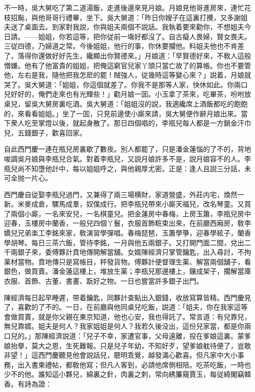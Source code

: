 不一時，吳大舅吃了第二道湯飯，走進後邊來見月娘。月娘見他哥進房來，連忙花枝招颭，與他哥哥行禮畢，坐下。吳大舅道：「昨日你嫂子在這裏打攪，又多謝姐夫送了桌面去。到家對我説，你與姐夫兩個不説話。我執着要來勸你，不想姐夫今日請。——姐姐，你若這等，把你従前一塲好都沒了。自古癡人畏婦，賢女畏夫。三従四德，乃婦道之常。今後姐姐，他行的事，你休要攔他。料姐夫他也不肯差了，落得你還做好好先生，纔顯出你賢德來。」月娘道：「早賢德好來，不敎人這般憎嫌。他有了他富貴的姐姐，把俺這窮官兒家丫頭只當亡故了的算帳。你也不要管他，左右是我，隨他把我怎麽的罷！賊強人，従幾時這等變心來？」説着，月娘就哭了。吳大舅道：「姐姐，你這個就差了。你我不是那等人家，快休如此。你兩口兒好好的，俺們走來也有光輝些！」勸月娘一囬。小玉拿了茶來，吃畢茶，吩咐放桌兒，留吳大舅房裏吃酒。吳大舅道：「姐姐沒的説，我適纔席上酒飯都吃的飽飽的，來看看姐姐。」坐了一囬，只見前邊使小廝來請，吳大舅便作辭月娘出來。當下衆人吃至掌燈以後，就起身散了。那日四個唱的，李瓶兒每人都是一方銷金汗巾兒，五錢銀子，歡喜回家。

自此西門慶一連在瓶兒房裏歇了數夜。別人都罷了，只是潘金蓮惱的了不的，背地唆調吳月娘與李瓶兒合氣。對着李瓶兒，又説月娘許多不是，説月娘容不的人。李瓶兒尚不知墮他計中，每以姐姐呼之，與他親厚尤密。正是：逢人且説三分話，未可全抛一片心。

西門慶自従娶李瓶兒過門，又兼得了兩三場横財，家道營盛，外莊内宅，煥然一新。米麥成倉，騾馬成羣，奴僕成行。把李瓶兒帶來小廝天福兒，改名琴童。又買了兩個小廝，一名來安兒，一名棋童兒。把金蓮房中春梅，上房玉簫，李瓶兒房中迎春，玉樓房中蘭香，一般兒四個丫鬟，衣服首飾粧束出來，在前廳西廂房，敎李嬌兒兄弟楽工李銘來家，敎演習學彈唱。春梅琵琶，玉簫學箏，迎春學絃子，蘭香學胡琴。每日三茶六飯，管待李銘，一月與他五兩銀子。又打開門面二間，兌出二千兩銀子來，委傅夥計賁地傳開解當舖。女婿陳經濟只掌管鑰匙，出入尋討，不拘薬材當物。賁地傳只是寫帳目，秤發貨物。傅夥計便督理生薬、解當兩個舖子，看銀色，做買賣。潘金蓮這樓上，堆放生薬；李瓶兒那邊樓上，鑲成架子，擱解當庫衣服、首飾、古董、書畫、翫好之物。一日也嘗當許多銀子出門。

陳經濟每日起早睡遲，带着鑰匙，同夥計查點出入銀錢，收放寫算皆精。西門慶見了，喜歡的了不的。一日，在前廳與他同桌兒吃飯，説道：「姐夫，你在我家這等會做買賣，就是你父親在東京知道，他也心安，我也得託了。常言道：有兒靠兒，無兒靠婿。姐夫是何人？我家姐姐是何人？我若久後没出，這份兒家當，都是你兩口兒的。」那陳經濟説道：「兒子不幸，家遭官事，父母遠離，投在爹娘這裏。蒙爹娘抬擧，莫大之恩，生死難報。只是兒子年幼，不知好歹，望爹娘躭待便了，豈敢非望！」這西門慶聽見他會説話兒，聰明乖覺，越發滿心歡喜。但凡家中大小事務，出入書柬禮帖，都敎他寫；但凡人客到，必請他席側相陪。吃茶吃飯，一時也少不的他。誰知這小夥兒，綿裏之針，肉裏之刺，常向綉簾窺賈玉，每従綺閣竊韓香。有詩為證：

